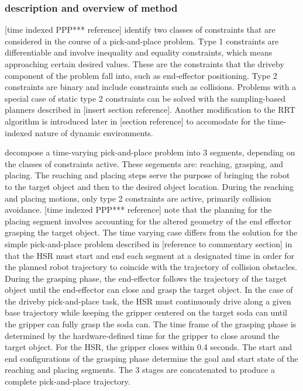 \documentclass[12pt]{article}
\begin{document}
        \subsubsection{description and overview of method}
            [time indexed PPP*** reference] identify two classes of constraints that are considered in the course of a pick-and-place problem. Type 1 constraints are differentiable and involve inequality and equality constraints, which means approaching certain desired values. These are the constraints that the driveby component of the problem fall into, such as end-effector positioning. Type 2 constraints are binary and include constraints such as collisions. Problems with a special case of static type 2 constraints can be solved with the sampling-based planners described in [insert section reference]. Another modification to the RRT algorithm is introduced later in [section reference] to accomodate for the time-indexed nature of dynamic environments.

            \par [time indexed PPP*** reference] decompose a time-varying pick-and-place problem into 3 segments, depending on the classes of constraints active. These segements are: reaching, grasping, and placing. The reaching and placing steps serve the purpose of bringing the robot to the target object and then to the desired object location. During the reaching and placing motions, only type 2 constraints are active, primarily collision avoidance. [time indexed PPP*** reference] note that the planning for the placing segment involves accounting for the altered geometry of the end effector grasping the target object. The time varying case differs from the solution for the simple pick-and-place problem described in [reference to commentary section] in that the HSR must start and end each segment at a designated time in order for the planned robot trajectory to coincide with the trajectory of collision obstacles. During the grasping phase, the end-effector follows the trajectory of the target object until the end-effector can close and grasp the target object. In the case of the driveby pick-and-place task, the HSR must continuously drive along a given base trajectory while keeping the gripper centered on the target soda can until the gripper can fully grasp the soda can. The time frame of the grasping phase is determined by the hardware-defined time for the gripper to close around the target object. For the HSR, the gripper closes within 0.4 seconds. The start and end configurations of the grasping phase determine the goal and start state of the reaching and placing segments. The 3 stages are concatenated to produce a complete pick-and-place trajectory.
\end{document}
